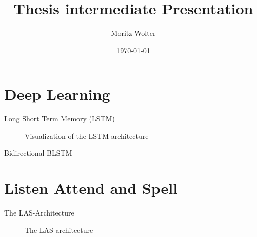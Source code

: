\documentclass{beamer}
\title{Thesis intermediate Presentation}
\author{Moritz Wolter}
\date{\today}
\begin{document}
\begin{frame}
  \titlepage
\end{frame}




\section{Deep Learning}
\begin{frame}{Long Short Term Memory (LSTM)}
\begin{figure}

\caption{Visualization of the LSTM architecture}
\label{fig:lstm}
\end{figure}
\end{frame}

\begin{frame}{Bidirectional BLSTM}




\end{frame}


\section{Listen Attend and Spell}
\begin{frame}{The LAS-Architecture}
\begin{figure}

\caption{The LAS architecture}
\label{fig:las}
\end{figure}
\end{frame}
\end{document}
